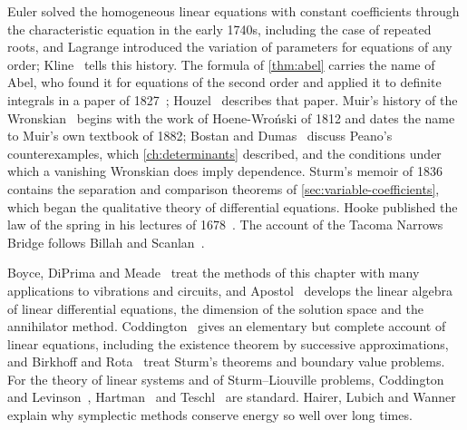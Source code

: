 \chapternotes

Euler solved the homogeneous linear equations with constant coefficients through the characteristic equation in the early 1740s, including the case of repeated roots, and Lagrange introduced the variation of parameters for equations of any order; Kline~\cite[Chap.~21]{kline1972} tells this history. The formula of \cref{thm:abel} carries the name of Abel, who found it for equations of the second order and applied it to definite integrals in a paper of 1827~\cite{abel1827}; Houzel~\cite{houzel2004} describes that paper. Muir's history of the Wronskian~\cite{muir1912} begins with the work of Hoene-Wro\'nski of 1812 and dates the name to Muir's own textbook of 1882; Bostan and Dumas~\cite{bostan2010} discuss Peano's counterexamples, which \cref{ch:determinants} described, and the conditions under which a vanishing Wronskian does imply dependence. Sturm's memoir of 1836~\cite{sturm1836} contains the separation and comparison theorems of \cref{sec:variable-coefficients}, which began the qualitative theory of differential equations. Hooke published the law of the spring in his lectures of 1678~\cite{hooke1678}. The account of the Tacoma Narrows Bridge follows Billah and Scanlan~\cite{billah1991}.

Boyce, DiPrima and Meade~\cite{boyce2017} treat the methods of this chapter with many applications to vibrations and circuits, and Apostol~\cite[Chap.~6]{apostol1969calculus} develops the linear algebra of linear differential equations, the dimension of the solution space and the annihilator method. Coddington~\cite{coddington1961} gives an elementary but complete account of linear equations, including the existence theorem by successive approximations, and Birkhoff and Rota~\cite{birkhoff1989} treat Sturm's theorems and boundary value problems. For the theory of linear systems and of Sturm--Liouville problems, Coddington and Levinson~\cite{coddington1955}, Hartman~\cite[Chaps.~IV and~XI]{hartman2002} and Teschl~\cite{teschl2012} are standard. Hairer, Lubich and Wanner~\cite{hairer2006geometric} explain why symplectic methods conserve energy so well over long times.

\chapterreferences
